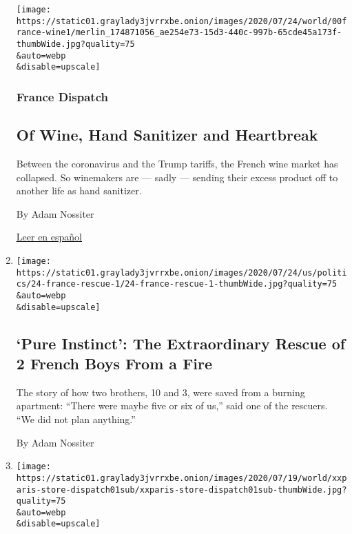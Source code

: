 \begin{enumerate}
  \texttt{[image: https://static01.graylady3jvrrxbe.onion/images/2020/07/24/world/00france-wine1/merlin\_174871056\_ae254e73-15d3-440c-997b-65cde45a173f-thumbWide.jpg?quality=75\\\&auto=webp\\\&disable=upscale]}

  \hypertarget{france-dispatch}{%
  \subsubsection{France Dispatch}\label{france-dispatch}}

  \hypertarget{of-wine-hand-sanitizer-and-heartbreak}{%
  \subsection{Of Wine, Hand Sanitizer and
  Heartbreak}\label{of-wine-hand-sanitizer-and-heartbreak}}

  Between the coronavirus and the Trump tariffs, the French wine market
  has collapsed. So winemakers are --- sadly --- sending their excess
  product off to another life as hand sanitizer.

  By Adam Nossiter

  \href{https://www.nytimes3xbfgragh.onion/es/2020/07/28/espanol/mundo/vino-blanco-alsacia-coronavirus.html}{Leer
  en español}
\item
  \href{/2020/07/24/world/europe/grenoble-france-fire-rescue.html}{}

  \texttt{[image: https://static01.graylady3jvrrxbe.onion/images/2020/07/24/us/politics/24-france-rescue-1/24-france-rescue-1-thumbWide.jpg?quality=75\\\&auto=webp\\\&disable=upscale]}

  \hypertarget{pure-instinct-the-extraordinary-rescue-of-2-french-boys-from-a-fire}{%
  \subsection{`Pure Instinct': The Extraordinary Rescue of 2 French Boys
  From a
  Fire}\label{pure-instinct-the-extraordinary-rescue-of-2-french-boys-from-a-fire}}

  The story of how two brothers, 10 and 3, were saved from a burning
  apartment: ``There were maybe five or six of us,'' said one of the
  rescuers. ``We did not plan anything.''

  By Adam Nossiter
\item
  \href{/2020/07/20/world/europe/france-paris-tati-coronavirus.html}{}

  \texttt{[image: https://static01.graylady3jvrrxbe.onion/images/2020/07/19/world/xxparis-store-dispatch01sub/xxparis-store-dispatch01sub-thumbWide.jpg?quality=75\\\&auto=webp\\\&disable=upscale]}


\end{enumerate}
